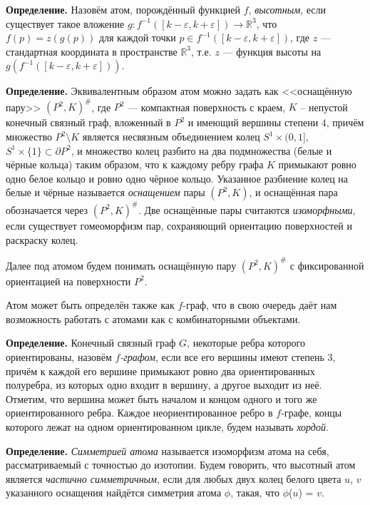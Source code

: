 \textbf{Определение. }
	Назовём атом, порождённый функцией $f$, {\em высотным}, если существует такое вложение $g
	\colon f^{-1}([k-\varepsilon, k+\varepsilon ]) \to \mathbb{R}^3$, что $f(p) = z(g(p))$ для каждой точки $p \in f^{-1}([k-\varepsilon, k+\varepsilon ])$, где $z$
	--- стандартная координата в пространстве $\mathbb R^3$, т.е. $z$ --- функция высоты на $g(f^{-1}([k-\varepsilon, k+\varepsilon ]))$.




\textbf{Определение.} Эквивалентным образом атом можно задать как <<оснащённую пару>> $(P^2, K)^\#$, где $P^2$ --- компактная   поверхность с краем, $K$ -- непустой конечный связный граф, вложенный в $P^2$ и имеющий вершины  степени $4$, причём множество $P^2 \setminus K$ является несвязным объединением колец $S^1 \times (0, 1]$, $ S^1 \times \{1\} \subset\partial P^2$, и множество колец разбито на два подмножества (белые и чёрные кольца) таким образом, что  к каждому ребру графа $K$ примыкают ровно одно белое кольцо и ровно одно чёрное кольцо. Указанное разбиение колец на белые и чёрные называется {\em  оснащением} пары $(P^2, K)$, и оснащённая пара обозначается через $(P^2, K)^\#$. Две оснащённые пары считаются {\em изоморфными}, если существует гомеоморфизм пар, сохраняющий ориентацию поверхностей и раскраску колец.


Далее под атомом будем понимать оснащённую пару $(P^2, K)^\#$ с фиксированной ориентацией на поверхности $P^2$.



Атом может быть определён также как $f$-граф, что в свою очередь даёт нам возможность работать с атомами как с комбинаторными объектами.



\textbf{Определение.} %
Конечный связный граф $G$, некоторые ребра которого ориентированы, назовём {\em
$f$-графом}, если все его вершины имеют степень $3$, причём к каждой его
вершине примыкают ровно два ориентированных полуребра, из которых одно входит в вершину,
а другое выходит из неё. Отметим, что вершина может быть началом и концом одного и того
же ориентированного ребра. Каждое неориентированное ребро в $f$-графе, концы которого лежат на одном ориентированном цикле, будем называть { \em хордой}.



{\bf Определение.}
	{\em Симметрией атома} называется изоморфизм атома на себя, рассматриваемый с точностью до изотопии. Будем говорить, что высотный атом является {\em частично симметричным}, если для любых двух колец белого цвета $u$, $v$ указанного оснащения найдётся симметрия атома $\phi $, такая, что $\phi$($u$) = $v$.




